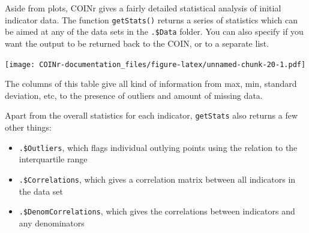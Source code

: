 \documentclass[
]{book}
\newenvironment{Shaded}{\begin{snugshade}}{\end{snugshade}}
\newcommand{\CommentTok}[1]{\textcolor[rgb]{0.56,0.35,0.01}{\textit{#1}}}
\newcommand{\DataTypeTok}[1]{\textcolor[rgb]{0.13,0.29,0.53}{#1}}
\newcommand{\DecValTok}[1]{\textcolor[rgb]{0.00,0.00,0.81}{#1}}
\newcommand{\KeywordTok}[1]{\textcolor[rgb]{0.13,0.29,0.53}{\textbf{#1}}}
\newcommand{\NormalTok}[1]{#1}
\newcommand{\OperatorTok}[1]{\textcolor[rgb]{0.81,0.36,0.00}{\textbf{#1}}}
\newcommand{\OtherTok}[1]{\textcolor[rgb]{0.56,0.35,0.01}{#1}}
\newcommand{\StringTok}[1]{\textcolor[rgb]{0.31,0.60,0.02}{#1}}
\providecommand{\tightlist}{%
  \setlength{\itemsep}{0pt}\setlength{\parskip}{0pt}}
\begin{document}
Aside from plots, COINr gives a fairly detailed statistical analysis of initial indicator data. The function \texttt{getStats()} returns a series of statistics which can be aimed at any of the data sets in the \texttt{.\$Data} folder. You can also specify if you want the output to be returned back to the COIN, or to a separate list.

\begin{Shaded}
\end{Shaded}

\texttt{[image: COINr-documentation\_files/figure-latex/unnamed-chunk-20-1.pdf]}

The columns of this table give all kind of information from max, min, standard deviation, etc, to the presence of outliers and amount of missing data.

Apart from the overall statistics for each indicator, \texttt{getStats} also returns a few other things:

\begin{itemize}
\tightlist
\item
  \texttt{.\$Outliers}, which flags individual outlying points using the relation to the interquartile range
\item
  \texttt{.\$Correlations}, which gives a correlation matrix between all indicators in the data set
\item
  \texttt{.\$DenomCorrelations}, which gives the correlations between indicators and any denominators
\end{itemize}
\end{document}
